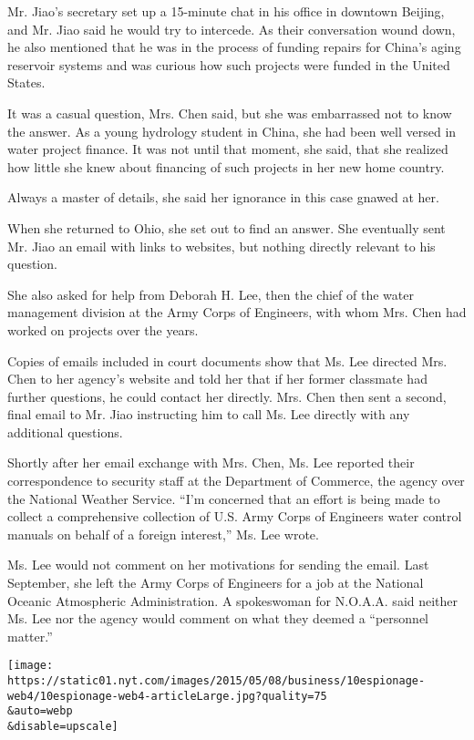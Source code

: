 Mr. Jiao's secretary set up a 15-minute chat in his office in downtown
Beijing, and Mr. Jiao said he would try to intercede. As their
conversation wound down, he also mentioned that he was in the process of
funding repairs for China's aging reservoir systems and was curious how
such projects were funded in the United States.

It was a casual question, Mrs. Chen said, but she was embarrassed not to
know the answer. As a young hydrology student in China, she had been
well versed in water project finance. It was not until that moment, she
said, that she realized how little she knew about financing of such
projects in her new home country.

Always a master of details, she said her ignorance in this case gnawed
at her.

When she returned to Ohio, she set out to find an answer. She eventually
sent Mr. Jiao an email with links to websites, but nothing directly
relevant to his question.

She also asked for help from Deborah H. Lee, then the chief of the water
management division at the Army Corps of Engineers, with whom Mrs. Chen
had worked on projects over the years.

Copies of emails included in court documents show that Ms. Lee directed
Mrs. Chen to her agency's website and told her that if her former
classmate had further questions, he could contact her directly. Mrs.
Chen then sent a second, final email to Mr. Jiao instructing him to call
Ms. Lee directly with any additional questions.

Shortly after her email exchange with Mrs. Chen, Ms. Lee reported their
correspondence to security staff at the Department of Commerce, the
agency over the National Weather Service. ``I'm concerned that an effort
is being made to collect a comprehensive collection of U.S. Army Corps
of Engineers water control manuals on behalf of a foreign interest,''
Ms. Lee wrote.

Ms. Lee would not comment on her motivations for sending the email. Last
September, she left the Army Corps of Engineers for a job at the
National Oceanic Atmospheric Administration. A spokeswoman for N.O.A.A.
said neither Ms. Lee nor the agency would comment on what they deemed a
``personnel matter.''

\texttt{[image: https://static01.nyt.com/images/2015/05/08/business/10espionage-web4/10espionage-web4-articleLarge.jpg?quality=75\\\&auto=webp\\\&disable=upscale]}

